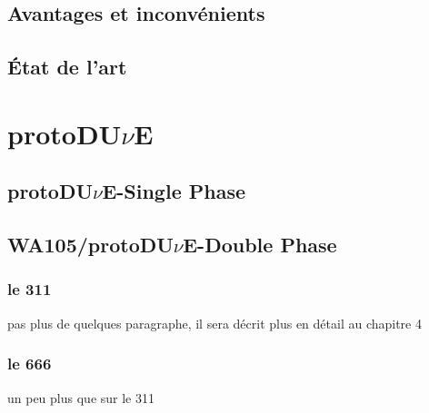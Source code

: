     \subsection{Avantages et inconvénients}
    \subsection{État de l'art}
    
  \section{\texorpdfstring{protoDU$\nu$E}{protoDUNE}}
    \subsection{\texorpdfstring{protoDU$\nu$E}{protoDUNE}-Single Phase}
    \subsection{WA105/\texorpdfstring{protoDU$\nu$E}{protoDUNE}-Double Phase}
      \subsubsection{le 311}
        pas plus de quelques paragraphe, il sera décrit plus en détail au chapitre 4
      \subsubsection{le 666}
        un peu plus que sur le 311